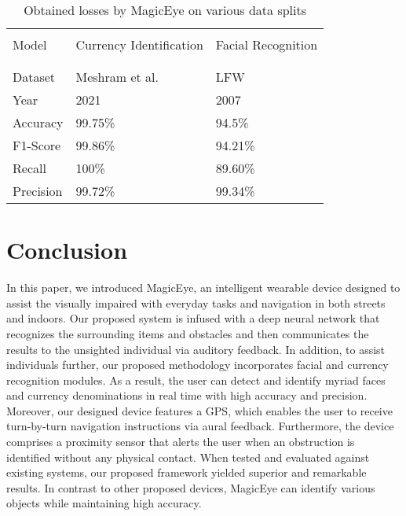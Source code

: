 \documentclass[journal,12pt,onecolumn,letterpaper]{IEEEtran}
\begin{document}
\begin{table}[htbp]
\centering
\caption{Obtained losses by MagicEye on various data splits}
\label{TBL:Model_results}
\begin{tabular}{ p{5cm} p{5cm} p{5cm}}
 \hline \hline \\
  Model &Currency Identification &Facial Recognition\\ \\
    \hline \\
  Dataset &Meshram et al. \cite{meshram_dataset_2021} &LFW \cite{LFWTech}\\
  Year &2021 &2007\\
  Accuracy &99.75\% &94.5\%\\
  F1-Score &99.86\% &94.21\%\\
  Recall &100\% &89.60\%\\
  Precision &99.72\% &99.34\%\\
  \hline
\hline
\end{tabular}
\end{table}








\section{Conclusion}
\label{Sec:Conclusion}

In this paper, we introduced MagicEye, an intelligent wearable device designed to assist the visually impaired with everyday tasks and navigation in both streets and indoors. Our proposed system is infused with a deep neural network that recognizes the surrounding items and obstacles and then communicates the results to the unsighted individual via auditory feedback. In addition, to assist individuals further, our proposed methodology incorporates facial and currency recognition modules. As a result, the user can detect and identify myriad faces and currency denominations in real time with high accuracy and precision. Moreover, our designed device features a GPS, which enables the user to receive turn-by-turn navigation instructions via aural feedback. Furthermore, the device comprises a proximity sensor that alerts the user when an obstruction is identified without any physical contact. When tested and evaluated against existing systems, our proposed framework yielded superior and remarkable results. In contrast to other proposed devices, MagicEye can identify various objects while maintaining high accuracy.
\end{document}
